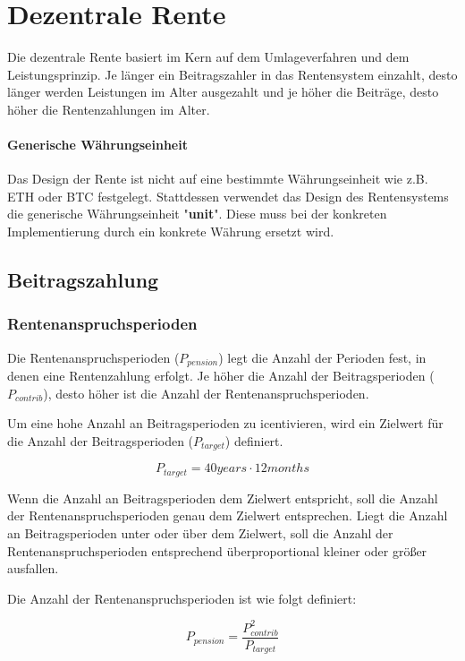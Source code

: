 \section{Dezentrale Rente}
Die dezentrale Rente basiert im Kern auf dem Umlageverfahren und dem
Leistungsprinzip. Je länger ein Beitragszahler in das Rentensystem einzahlt, 
desto länger werden Leistungen im Alter ausgezahlt und je höher die Beiträge,
desto höher die Rentenzahlungen im Alter.

\paragraph{Generische Währungseinheit} Das Design der Rente ist nicht auf eine bestimmte 
Währungseinheit wie z.B. ETH oder BTC festgelegt. Stattdessen verwendet das Design des
Rentensystems die generische Währungseinheit "\textbf{unit}". Diese muss bei der konkreten
Implementierung durch ein konkrete Währung ersetzt wird.

\subsection{Beitragszahlung}

\subsubsection*{Rentenanspruchsperioden}
Die Rentenanspruchsperioden ($P_{pension}$) legt die Anzahl der Perioden fest,
in denen eine Rentenzahlung erfolgt. Je höher die Anzahl der Beitragsperioden
($P_{contrib}$), desto höher ist die Anzahl der Rentenanspruchsperioden.

Um eine hohe Anzahl an Beitragsperioden zu icentivieren, wird ein Zielwert 
für die Anzahl der Beitragsperioden ($P_{target}$) definiert. 

\begin{equation}
	P_{target} = 40 years \cdot 12 months
\end{equation}

Wenn die Anzahl an Beitragsperioden dem Zielwert entspricht, soll die Anzahl der 
Rentenanspruchsperioden genau dem Zielwert entsprechen. Liegt die  Anzahl an
Beitragsperioden unter oder über dem Zielwert, soll die Anzahl der 
Rentenanspruchsperioden entsprechend überproportional kleiner oder größer ausfallen.  

Die Anzahl der Rentenanspruchsperioden ist wie folgt definiert:

\begin{equation}
	P_{pension} = \frac{P_{contrib}^2}{P_{target}}
\end{equation}


